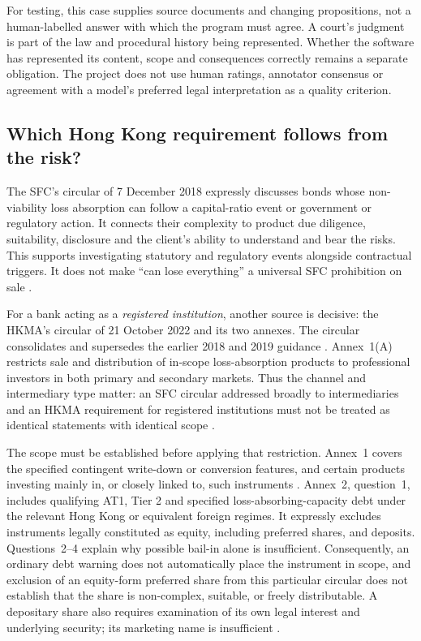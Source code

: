 For testing, this case supplies source documents and changing propositions,
not a human-labelled answer with which the program must agree. A court's
judgment is part of the law and procedural history being represented. Whether
the software has represented its content, scope and consequences correctly
remains a separate obligation. The project does not use human ratings,
annotator consensus or agreement with a model's preferred legal interpretation
as a quality criterion.

\subsection{Which Hong Kong requirement follows from the risk?}

The SFC's circular of 7 December 2018 expressly discusses bonds whose
non-viability loss absorption can follow a capital-ratio event or government
or regulatory action. It connects their complexity to product due diligence,
suitability, disclosure and the client's ability to understand and bear the
risks. This supports investigating statutory and regulatory events alongside
contractual triggers. It does not make ``can lose everything'' a universal
SFC prohibition on sale \citep[discussion of NVLA bonds and selling practices]{sfcnvla2018}.

For a bank acting as a \emph{registered institution}, another source is decisive:
the HKMA's circular of 21 October 2022 and its two annexes. The circular
consolidates and supersedes the earlier 2018 and 2019 guidance
\citep{hkmalac2022}. Annex~1(A)
restricts sale and distribution of in-scope loss-absorption products to
professional investors in both primary and secondary markets. Thus the channel
and intermediary type matter: an SFC circular addressed broadly to
intermediaries and an HKMA requirement for registered institutions must not be
treated as identical statements with identical scope
\citep[applicability and section~A]{hkmalacannex2022}.

The scope must be established before applying that restriction. Annex~1 covers
the specified contingent write-down or conversion features, and certain
products investing mainly in, or closely linked to, such instruments
\citep[applicability]{hkmalacannex2022}.
Annex~2, question~1, includes qualifying AT1, Tier 2 and specified
loss-absorbing-capacity debt under the relevant Hong Kong or equivalent foreign
regimes. It expressly excludes instruments legally constituted as equity,
including preferred shares, and deposits. Questions~2--4 explain why possible
bail-in alone is insufficient. Consequently, an ordinary debt warning does not
automatically place the instrument in scope, and exclusion of an equity-form
preferred share from this particular circular does not establish that the
share is non-complex, suitable, or freely distributable. A depositary share
also requires examination of its own legal interest and underlying security;
its marketing name is insufficient
\citep[questions~1--4]{hkmalacfaq2022}.

